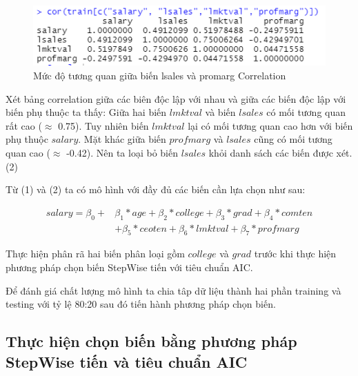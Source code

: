 \begin{figure}[H]
	\centering
	\includegraphics[scale = 0.6]{../Photo Of Result/B1_CorTable.PNG}  
	\caption{Mức độ tương quan giữa biến lsales và promarg Correlation}
	\label{fig-b1:corr-table}
\end{figure}

Xét bảng correlation giữa các biên độc lập với nhau và giữa các biến độc lập với biến phụ thuộc ta thấy: Giữa hai biến $\textit{lmktval}$ và biến $\textit{lsales}$ có mối tương quan rất cao ($\approx$ 0.75). Tuy nhiên biến $\textit{lmktval}$ lại có mối tương quan cao hơn với biến phụ thuộc $\textit{salary}$. Mặt khác giữa biến $\textit{profmarg}$ và $\textit{lsales}$ cũng có mối tương quan cao ($\approx$ -0.42). Nên ta loại bỏ biến $\textit{lsales}$ khỏi danh sách các biến được xét. (2)

Từ (1) và (2) ta có mô hình với đầy đủ các biến cần lựa chọn như sau:

\begin{equation}\label{eq-b1:full-model}
	\begin{split}
		salary 	= \beta_0 + &\beta_1*age + \beta_2*college + \beta_3*grad + \beta_4*comten\\
		&+ \beta_5*ceoten + \beta_6*lmktval + \beta_7*profmarg
	\end{split}
\end{equation}


Thực hiện phân rã hai biến phân loại gồm $college$ và $grad$ trước khi thực hiện phương pháp chọn biến StepWise tiến với tiêu chuẩn AIC.

Để đánh giá chất lượng mô hình ta chia tâp dữ liệu thành hai phần training và testing với tỷ lệ 80:20 sau đó tiến hành phương pháp chọn biến.

\subsection*{Thực hiện chọn biến bằng phương pháp StepWise tiến và tiêu chuẩn AIC}

